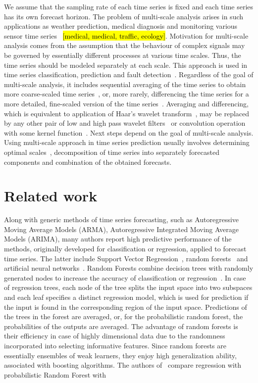 \documentclass[conference]{IEEEtran}
\begin{document}
We assume that the sampling rate of each time series is fixed and each time series has its own forecast horizon. The problem of multi-scale analysis arises in such applications as weather prediction, medical diagnosis and monitoring various sensor time series~\cite{Costa2008, Ahmed2012, Cortez2012, Ferreira2006} \hl{[medical, medical, traffic, ecology]}. Motivation for multi-scale analysis comes from the assumption that the behaviour of complex signals may be governed by  essentially different processes at various time scales. Thus, the time series should be modeled separately at each scale. This approach is used in time series classification, prediction and fault detection~\cite{Cui2016, Cortez2012, Aldrich2013}. Regardless of the goal of multi-scale analysis, it includes sequential averaging of the time series to obtain more coarse-scaled time series~\cite{Wu2013}, or, more rarely, differencing the time series for a more detailed, fine-scaled version of the time series~\cite{Jiang2011}. Averaging and differencing, which is equivalent to application of Haar's wavelet transform~\cite{Jiang2011}, may be replaced by any other pair of low and high pass wavelet filters~\cite{Chen2004} or convolution operation with some kernel function~\cite{Vespier2012}. Next steps depend on the goal of multi-scale analysis. Using multi-scale approach in time series prediction usually involves determining optimal scales~\cite{Vespier2012, Ahmed2012}, decomposition of time series into separately forecasted components and combination of the obtained forecasts.


\section{Related work}
 Along with generic methods of time series forecasting, such as Autoregressive Moving Average Models (ARMA), Autoregressive Integrated Moving Average Models (ARIMA), many authors report high predictive performance of the methods, originally developed for classification or regression, applied to forecast time series. The latter include Support Vector Regression~\cite{Trafalis2000, Navarrete2015, Hao2006}, random forests~\cite{Yu2016, Kane2014} and artificial neural networks~\cite{Busseti2012, Taylor2009}.
 Random Forests combine decision trees with randomly generated nodes to increase the accuracy of classification or regression~\cite{Criminisi2011}. In case of regression trees, each node of the tree splits the input space into two subspaces and each leaf specifies a distinct regression model, which is used for prediction if the input is found in the corresponding region of the input space. Predictions of the trees in the forest are averaged, or, for the probabilistic random forest, the probabilities of the outputs are averaged. The advantage of random forests is their efficiency in case of highly dimensional data due to the randomness incorporated into selecting informative features. Since random forests are essentially ensembles of weak learners, they enjoy high generalization ability, associated with boosting algorithms. The authors of~\cite{Criminisi2011} compare regression with probabilistic Random Forest with
\end{document}

